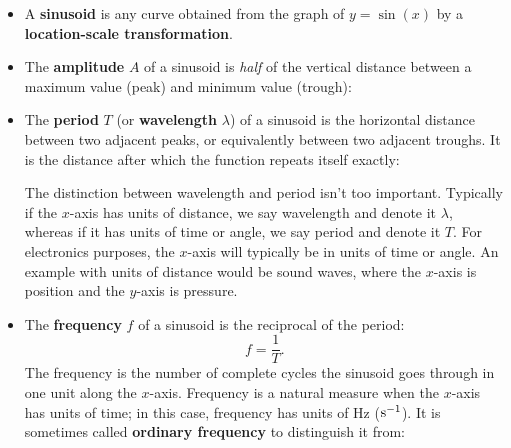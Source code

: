 \documentclass{article}
\begin{document}
\begin{itemize}
\item A \textbf{sinusoid} is any curve obtained from the graph of $y=\sin(x)$ by a \textbf{location-scale transformation}.
\item The \textbf{amplitude} $A$ of a sinusoid is \textit{half} of the vertical distance between a maximum value (peak) and minimum value (trough):
	\begin{center}
	\end{center}
\item The \textbf{period} $T$ (or \textbf{wavelength} $\lambda$) of a sinusoid is the horizontal distance between two adjacent peaks, or equivalently between two adjacent troughs. It is the distance after which the function repeats itself exactly:
	\begin{center}
	\end{center}
	
	The distinction between wavelength and period isn't too important. Typically if the $x$-axis has units of distance, we say wavelength and denote it $\lambda$, whereas if it has units of time or angle, we say period and denote it $T$. For electronics purposes, the $x$-axis will typically be in units of time or angle. An example with units of distance would be sound waves, where the $x$-axis is position and the $y$-axis is pressure.
		
\item The \textbf{frequency} $f$ of a sinusoid is the reciprocal of the period:
	\[f=\frac{1}{T}.\]
	The frequency is the number of complete cycles the sinusoid goes through in one unit along the $x$-axis. Frequency is a natural measure when the $x$-axis has units of time; in this case, frequency has units of Hz ($\rm{s}^{-1}$). It is sometimes called \textbf{ordinary frequency} to distinguish it from:
	

\end{itemize}
\end{document}
